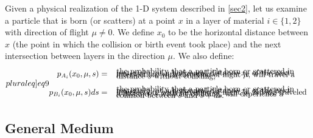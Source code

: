 \documentclass[12pt]{article}
\begin{document}
Given a physical realization of the 1-D system described in \cref{sec2}, let us examine a particle that is born (or scatters) at a point $x$ in a layer of material $i \in \{1,2\}$ with direction of flight $\mu\neq 0$.
We define $x_0$ to be the horizontal distance between $x$ (the point in which the collision or birth event took place) and the next intersection between layers in the direction $\mu$.
We also define:
\begin{subequations}\label[pluraleq]{eq9}
\begin{align}
p_{A_i}(x_0,\mu,s) &= \begin{array}{l}
\text{ the probability that a particle born or scattered in}\vspace{-10pt}\\
\text{ material $i$, at a horizontal distance $x_0$ of the next}\vspace{-10pt}\\
\text{ intersection, with direction of flight $\mu$, will travel a}\vspace{-10pt}\\
\text{ distance $s$ without colliding;}
\end{array}
\\
p_{B_i}(x_0,\mu,s)ds &= \begin{array}{l}
\text{ the probability that a particle born or scattered in}\vspace{-10pt}\\
\text{ material $i$, at a horizontal distance $x_0$ of the next}\vspace{-10pt}\\
\text{ intersection, with direction of flight $\mu$, having traveled}\vspace{-10pt}\\
\text{ a distance $s$ without colliding, will experience a}\vspace{-10pt}\\
\text{ collision between $s$ and $s+ds$.}
\end{array}
\end{align}
\end{subequations}

\subsection{General Medium}
\label{sec3A}
\end{document}
